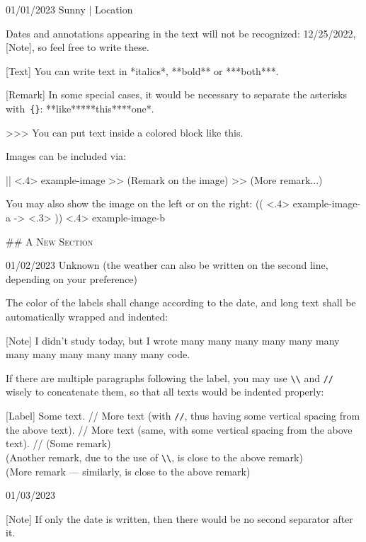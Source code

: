 \documentclass[11pt, paperstyle=light yellow, color entry, month-day-year,
  title in boldface, title in sffamily, use style = classical]{jwjournal}
\begin{document}
01/01/2023 Sunny | Location

  Dates and annotations appearing in the text will not be recognized: 12/25/2022, [Note], so feel free to write these.

  [Text] You can write text in *italics*, **bold** or ***both***.

  [Remark] In some special cases, it would be necessary to separate the asterisks with~\texttt{\{\}}: **like**{}***this***{}*one*.

  >>> You can put text inside a colored block like this.

  Images can be included via:

  || <.4> {example-image} %
  >> (Remark on the image)
  >> (More remark...)

  You may also show the image on the left or on the right:
  (( <.4> {example-image-a} %
  -> <.3> %
  )) <.4> {example-image-b} %


## {\textsc{A New Section}}

01/02/2023
Unknown (the weather can also be written on the second line, depending on your preference)

  The color of the labels shall change according to the date, and long text shall be automatically wrapped and indented:

  [Note] I didn't study today, but I wrote many many many many many many many many many many many many code.

  If there are multiple paragraphs following the label, you may use \texttt{\textbackslash\textbackslash} and \texttt{\slash\slash} wisely to concatenate them, so that all texts would be indented properly:

  [Label] Some text.
    //
    More text (with \texttt{\slash\slash}, thus having some vertical spacing from the above text).
    //
    More text (same, with some vertical spacing from the above text).
    //
    (Some remark)
    \\
    (Another remark, due to the use of \texttt{\textbackslash\textbackslash}, is close to the above remark)
    \\
    (More remark --- similarly, is close to the above remark)



01/03/2023

  [Note] If only the date is written, then there would be no second separator after it.
\end{document}
